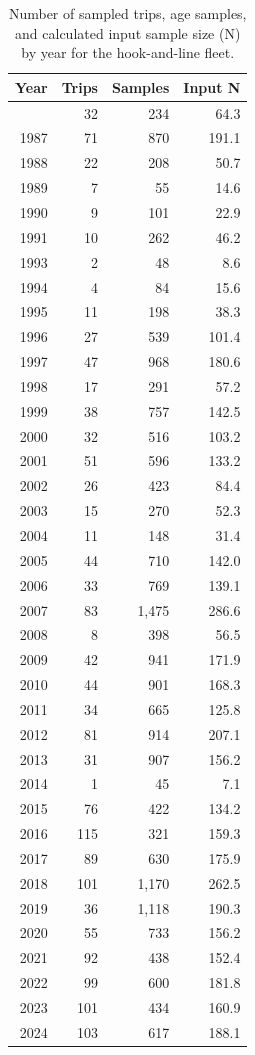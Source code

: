 \documentclass[
  english,
]{article}
\begin{document}
\endgroup

\pagebreak

\begingroup
\fontsize{9.0pt}{11.0pt}\selectfont

\begin{longtable}{rrrr}

\caption{\label{tbl-hkl-age-samples}Number of sampled trips, age
samples, and calculated input sample size (N) by year for the
hook-and-line fleet.}

\tabularnewline

\toprule
Year & Trips & Samples & Input N \\ 
\midrule\addlinespace[2.5pt]
1986 & 32 & 234 & 64.3 \\ 
1987 & 71 & 870 & 191.1 \\ 
1988 & 22 & 208 & 50.7 \\ 
1989 & 7 & 55 & 14.6 \\ 
1990 & 9 & 101 & 22.9 \\ 
1991 & 10 & 262 & 46.2 \\ 
1993 & 2 & 48 & 8.6 \\ 
1994 & 4 & 84 & 15.6 \\ 
1995 & 11 & 198 & 38.3 \\ 
1996 & 27 & 539 & 101.4 \\ 
1997 & 47 & 968 & 180.6 \\ 
1998 & 17 & 291 & 57.2 \\ 
1999 & 38 & 757 & 142.5 \\ 
2000 & 32 & 516 & 103.2 \\ 
2001 & 51 & 596 & 133.2 \\ 
2002 & 26 & 423 & 84.4 \\ 
2003 & 15 & 270 & 52.3 \\ 
2004 & 11 & 148 & 31.4 \\ 
2005 & 44 & 710 & 142.0 \\ 
2006 & 33 & 769 & 139.1 \\ 
2007 & 83 & 1,475 & 286.6 \\ 
2008 & 8 & 398 & 56.5 \\ 
2009 & 42 & 941 & 171.9 \\ 
2010 & 44 & 901 & 168.3 \\ 
2011 & 34 & 665 & 125.8 \\ 
2012 & 81 & 914 & 207.1 \\ 
2013 & 31 & 907 & 156.2 \\ 
2014 & 1 & 45 & 7.1 \\ 
2015 & 76 & 422 & 134.2 \\ 
2016 & 115 & 321 & 159.3 \\ 
2017 & 89 & 630 & 175.9 \\ 
2018 & 101 & 1,170 & 262.5 \\ 
2019 & 36 & 1,118 & 190.3 \\ 
2020 & 55 & 733 & 156.2 \\ 
2021 & 92 & 438 & 152.4 \\ 
2022 & 99 & 600 & 181.8 \\ 
2023 & 101 & 434 & 160.9 \\ 
2024 & 103 & 617 & 188.1 \\ 
\bottomrule


\end{longtable}
\end{document}
